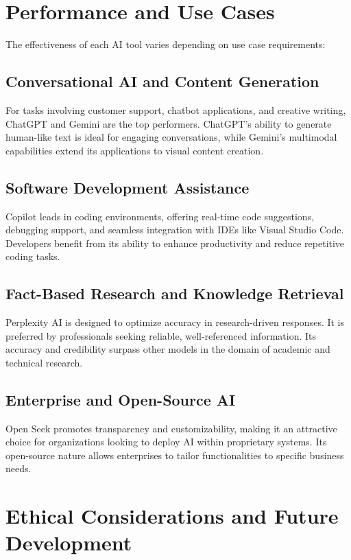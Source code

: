 \documentclass[a4paper,headinclude=on,footinclude=on,12pt,oneside]{scrbook}
\begin{document}
\section{Performance and Use Cases}

The effectiveness of each AI tool varies depending on use case requirements:

\subsection{Conversational AI and Content Generation}

For tasks involving customer support, chatbot applications, and creative writing, ChatGPT and Gemini are the top performers. ChatGPT's ability to generate human-like text is ideal for engaging conversations, while Gemini's multimodal capabilities extend its applications to visual content creation.

\subsection{Software Development Assistance}

Copilot leads in coding environments, offering real-time code suggestions, debugging support, and seamless integration with IDEs like Visual Studio Code. Developers benefit from its ability to enhance productivity and reduce repetitive coding tasks.

\subsection{Fact-Based Research and Knowledge Retrieval}

Perplexity AI is designed to optimize accuracy in research-driven responses. It is preferred by professionals seeking reliable, well-referenced information. Its accuracy and credibility surpass other models in the domain of academic and technical research.

\subsection{Enterprise and Open-Source AI}

Open Seek promotes transparency and customizability, making it an attractive choice for organizations looking to deploy AI within proprietary systems. Its open-source nature allows enterprises to tailor functionalities to specific business needs.

\section{Ethical Considerations and Future Development}
\end{document}
